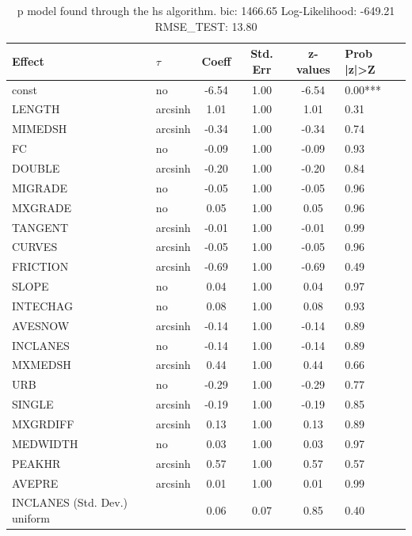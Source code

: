 \begin{table}
	\caption{p model found through the hs algorithm. bic: 1466.65 Log-Likelihood: -649.21 RMSE_TEST: 13.80}
	\begin{center}
		\begin{tabular}{|l|l|c|c|c|l|}
			\hline
			Effect & $\tau$ & Coeff & Std. Err & z-values & Prob |z|>Z \\
			\hline
			const & no & -6.54 & 1.00 & -6.54 & 0.00*** \\
			\hline
			LENGTH & arcsinh & 1.01 & 1.00 & 1.01 & 0.31 \\
			\hline
			MIMEDSH & arcsinh & -0.34 & 1.00 & -0.34 & 0.74 \\
			\hline
			FC & no & -0.09 & 1.00 & -0.09 & 0.93 \\
			\hline
			DOUBLE & arcsinh & -0.20 & 1.00 & -0.20 & 0.84 \\
			\hline
			MIGRADE & no & -0.05 & 1.00 & -0.05 & 0.96 \\
			\hline
			MXGRADE & no & 0.05 & 1.00 & 0.05 & 0.96 \\
			\hline
			TANGENT & arcsinh & -0.01 & 1.00 & -0.01 & 0.99 \\
			\hline
			CURVES & arcsinh & -0.05 & 1.00 & -0.05 & 0.96 \\
			\hline
			FRICTION & arcsinh & -0.69 & 1.00 & -0.69 & 0.49 \\
			\hline
			SLOPE & no & 0.04 & 1.00 & 0.04 & 0.97 \\
			\hline
			INTECHAG & no & 0.08 & 1.00 & 0.08 & 0.93 \\
			\hline
			AVESNOW & arcsinh & -0.14 & 1.00 & -0.14 & 0.89 \\
			\hline
			INCLANES & no & -0.14 & 1.00 & -0.14 & 0.89 \\
			\hline
			MXMEDSH & arcsinh & 0.44 & 1.00 & 0.44 & 0.66 \\
			\hline
			URB & no & -0.29 & 1.00 & -0.29 & 0.77 \\
			\hline
			SINGLE & arcsinh & -0.19 & 1.00 & -0.19 & 0.85 \\
			\hline
			MXGRDIFF & arcsinh & 0.13 & 1.00 & 0.13 & 0.89 \\
			\hline
			MEDWIDTH & no & 0.03 & 1.00 & 0.03 & 0.97 \\
			\hline
			PEAKHR & arcsinh & 0.57 & 1.00 & 0.57 & 0.57 \\
			\hline
			AVEPRE & arcsinh & 0.01 & 1.00 & 0.01 & 0.99 \\
			\hline
			INCLANES (Std. Dev.) uniform &  & 0.06 & 0.07 & 0.85 & 0.40 \\

\end{tabular}
\end{center}
\end{table}
